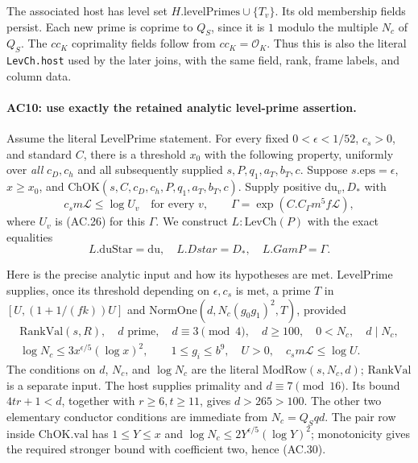 The associated host has level set
$H.\mathrm{levelPrimes}\cup\{T_v\}$. Its old membership fields persist.
Each new prime is coprime to $Q_S$, since it is $1$ modulo the
multiple $N_c$ of $Q_S$. The $cc_K$ coprimality fields follow from
$cc_K=\mathcal O_K$. Thus this is also the literal
\texttt{LevCh.host} used by the later joins, with the same field,
rank, frame labels, and column data.

\paragraph{AC10: use exactly the retained analytic level-prime assertion.}
Assume the literal $\mathrm{LevelPrime}$ statement. For every fixed
$0<\epsilon<1/52$, $c_s>0$, and standard $C$, there is a threshold
$x_0$ with the following property, uniformly over \emph{all} $c_D,c_h$
and all subsequently supplied $s,P,q_1,a_T,b_T,c$.
Suppose $s.\mathrm{eps}=\epsilon$, $x\geq x_0$, and
$\mathrm{ChOK}(s,C,c_D,c_h,P,q_1,a_T,b_T,c)$.
Supply positive $\mathrm{du}_v,D_*$ with
\[
       c_s m\mathcal L\leq\log U_v\quad\text{for every }v,
       \qquad
       \Gamma=\exp(C.C_\Gamma m^5 f\mathcal L),               \tag{AC.28}
\]
where $U_v$ is (AC.26) for this $\Gamma$.
We construct $L:\mathrm{LevCh}(P)$ with the exact equalities
\[
              L.\mathrm{duStar}=\mathrm{du},\quad
              L.Dstar=D_*,\quad L.GamP=\Gamma.              \tag{AC.29}
\]

Here is the precise analytic input and how its hypotheses are met.
$\mathrm{LevelPrime}$ supplies, once its threshold depending on
$\epsilon,c_s$ is met, a prime $T$ in
$[U,(1+1/(fk))U]$ and
$\mathrm{NormOne}(d,N_c(g_0g_1)^2,T)$, provided
\[
 \begin{gathered}
 \mathrm{RankVal}(s,R),\quad d\text{ prime},\quad d\equiv3\pmod4,
       \quad d\geq100,\quad 0<N_c,\quad d\mid N_c,\\
 \log N_c\leq3x^{\epsilon/5}(\log x)^2,\qquad
 1\leq g_i\leq b^9,\quad U>0,\quad c_s m\mathcal L\leq\log U.
 \end{gathered}                                              \tag{AC.30}
\]
The conditions on $d$, $N_c$, and $\log N_c$ are the literal
$\mathrm{ModRow}(s,N_c,d)$; $\mathrm{RankVal}$ is a separate input.
The host supplies primality and $d\equiv7\pmod {16}$.
Its bound $4tr+1<d$, together with $r\geq6,t\geq11$, gives
$d>265>100$. The other two elementary conductor conditions are
immediate from $N_c=Q_Sqd$. The pair row inside $\mathrm{ChOK.val}$
has $1\leq Y\leq x$ and
$\log N_c\leq2Y^{\epsilon/5}(\log Y)^2$; monotonicity gives
the required stronger bound with coefficient two, hence (AC.30).

